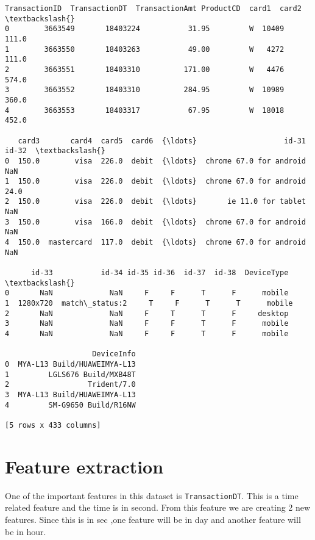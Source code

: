 \documentclass[11pt]{article}
\makeatletter
\newcommand{\boxspacing}{\kern\kvtcb@left@rule\kern\kvtcb@boxsep}
\newcommand{\prompt}[4]{
        \ttfamily\llap{{\color{#2}[#3]:\hspace{3pt}#4}}\vspace{-\baselineskip}
    }
\makeatother
\begin{document}
            \begin{tcolorbox}[breakable, size=fbox, boxrule=.5pt, pad at break*=1mm, opacityfill=0]
\prompt{Out}{outcolor}{7}{\boxspacing}
\begin{Verbatim}[commandchars=\\\{\}]
   TransactionID  TransactionDT  TransactionAmt ProductCD  card1  card2  \textbackslash{}
0        3663549       18403224           31.95         W  10409  111.0
1        3663550       18403263           49.00         W   4272  111.0
2        3663551       18403310          171.00         W   4476  574.0
3        3663552       18403310          284.95         W  10989  360.0
4        3663553       18403317           67.95         W  18018  452.0

   card3       card4  card5  card6  {\ldots}                    id-31  id-32  \textbackslash{}
0  150.0        visa  226.0  debit  {\ldots}  chrome 67.0 for android    NaN
1  150.0        visa  226.0  debit  {\ldots}  chrome 67.0 for android   24.0
2  150.0        visa  226.0  debit  {\ldots}       ie 11.0 for tablet    NaN
3  150.0        visa  166.0  debit  {\ldots}  chrome 67.0 for android    NaN
4  150.0  mastercard  117.0  debit  {\ldots}  chrome 67.0 for android    NaN

      id-33           id-34 id-35 id-36  id-37  id-38  DeviceType  \textbackslash{}
0       NaN             NaN     F     F      T      F      mobile
1  1280x720  match\_status:2     T     F      T      T      mobile
2       NaN             NaN     F     T      T      F     desktop
3       NaN             NaN     F     F      T      F      mobile
4       NaN             NaN     F     F      T      F      mobile

                    DeviceInfo
0  MYA-L13 Build/HUAWEIMYA-L13
1         LGLS676 Build/MXB48T
2                  Trident/7.0
3  MYA-L13 Build/HUAWEIMYA-L13
4         SM-G9650 Build/R16NW

[5 rows x 433 columns]
\end{Verbatim}
\end{tcolorbox}
        
    \hypertarget{feature-extraction}{%
\section{\texorpdfstring{\textbf{Feature
extraction}}{Feature extraction}}\label{feature-extraction}}

    One of the important features in this dataset is \texttt{TransactionDT}.
This is a time related feature and the time is in second. From this
feature we are creating 2 new features. Since this is in sec ,one
feature will be in day and another feature will be in hour.
\end{document}
